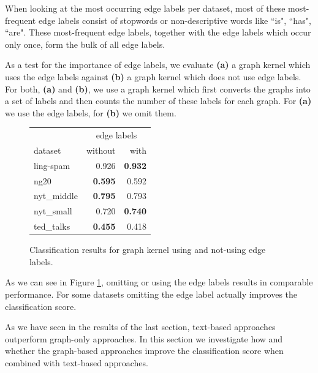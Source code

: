 When looking at the most occurring edge labels per dataset, most of these most-frequent edge labels consist of stopwords or non-descriptive words like ``is", ``has", ``are".
These most-frequent edge labels, together with the edge labels which occur only once, form the bulk of all edge labels.

As a test for the importance of edge labels, we evaluate \textbf{(a)} a graph kernel which uses the edge labels against \textbf{(b)} a graph kernel which does not use edge labels.
For both, \textbf{(a)} and \textbf{(b)}, we use a graph kernel which first converts the graphs into a set of labels and then counts the number of these labels for each graph.
For \textbf{(a)} we use the edge labels, for \textbf{(b)} we omit them.

\begin{figure}[ht]
	\centering
\begin{tabular}{lrr}
	{} & \multicolumn{2}{c}{edge labels} \\
	dataset & without & with \\
	\midrule
	ling-spam  & 0.926 & \textbf{0.932} \\
	ng20       & \textbf{0.595} & 0.592 \\
	nyt\_middle & \textbf{0.795} & 0.793 \\
	nyt\_small  & 0.720 &\textbf{ 0.740} \\
	ted\_talks  & \textbf{0.455} & 0.418 \\
	\bottomrule
\end{tabular}
\caption{Classification results for graph kernel using and not-using edge labels.}\label{fig:edge_label_classification}
\end{figure}

As we can see in Figure \ref{fig:edge_label_classification}, omitting or using the edge labels results in comparable performance.
For some datasets omitting the edge label actually improves the classification score.



As we have seen in the results of the last section, text-based approaches outperform graph-only approaches.
In this section we investigate how and whether the graph-based approaches improve the classification score when combined with text-based approaches.

